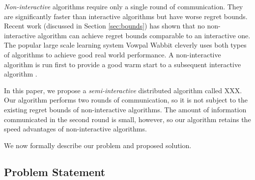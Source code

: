 \documentclass[twoside]{article}
\DeclareMathOperator*{\argmax}{arg\,max}
\newcommand{\Y}{\mathcal{Y}}
\newcommand{\X}{\mathcal{X}}
\newcommand{\x}{\mathbf{x}}
\newcommand{\w}{\theta}
\newcommand{\wmle}{\hat\w^{mle}}
\newcommand{\trans}[1]{\ensuremath{{#1}^{\mathsf{T}}}}
\begin{document}
\emph{Non-interactive} algorithms require only a single round of communication.
They are significantly faster than interactive algorithms
but have worse regret bounds.
Recent work (discussed in Section \ref{sec:bounds}) has shown that no non-interactive algorithm can achieve regret bounds comparable to an interactive one.
The popular large scale learning system Vowpal Wabbit cleverly uses both types of algorithms to achieve good real world performance.
A non-interactive algorithm is run first to provide a good warm start to a subsequent interactive algorithm \citep{vw,agarwal2014reliable}.

In this paper, we propose a \emph{semi-interactive} distributed algorithm called XXX.
Our algorithm performs two rounds of communication,
so it is not subject to the existing regret bounds of non-interactive algorithms.
The amount of information communicated in the second round is small, however,
so our algorithm retains the speed advantages of non-interactive algorithms.



We now formally describe our problem and proposed solution.

\subsection{Problem Statement}

\end{document}
